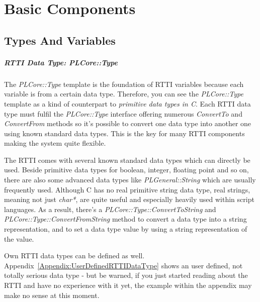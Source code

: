 \chapter{Basic Components}




\section{Types And Variables}
\paragraph{RTTI Data Type: PLCore::Type}
The \emph{PLCore::Type} template is the foundation of RTTI variables because each variable is from a certain data type. Therefore, you can see the \emph{PLCore::Type} template as a kind of counterpart to \emph{primitive data types in C}. Each RTTI data type must fulfil the \emph{PLCore::Type} interface offering numerous \emph{ConvertTo} and \emph{ConvertFrom} methods so it's possible to convert one data type into another one using known standard data types. This is the key for many RTTI components making the system quite flexible.

The RTTI comes with several known standard data types which can directly be used. Beside primitive data types for boolean, integer, floating point and so on, there are also some advanced data types like \emph{PLGeneral::String} which are usually frequently used. Although C has no real primitive string data type, real strings, meaning not just \emph{char*}, are quite useful and especially heavily used within script languages. As a result, there's a \emph{PLCore::Type::ConvertToString} and \emph{PLCore::Type::ConvertFromString} method to convert a data type into a string representation, and to set a data type value by using a string representation of the value.

Own RTTI data types can be defined as well. Appendix~\ref{Appendix:UserDefinedRTTIDataType} shows an user defined, not totally serious data type - but be warned, if you just started reading about the RTTI and have no experience with it yet, the example within the appendix may make no sense at this moment.


